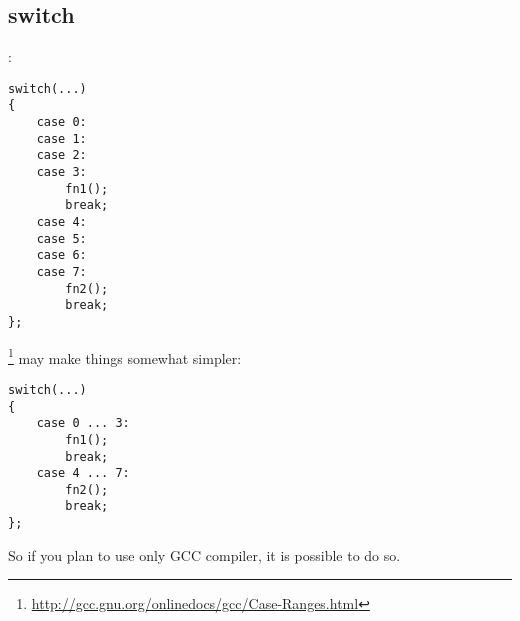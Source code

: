 ﻿\subsection{switch}

:

\begin{lstlisting}
switch(...)
{
	case 0:
	case 1:
	case 2:
	case 3:
		fn1();
		break;
	case 4:
	case 5:
	case 6:
	case 7:
		fn2();
		break;
};
\end{lstlisting}

\footnote{\url{http://gcc.gnu.org/onlinedocs/gcc/Case-Ranges.html}} 
{may make things somewhat simpler}:

\begin{lstlisting}
switch(...)
{
	case 0 ... 3:
		fn1();
		break;
	case 4 ... 7:
		fn2();
		break;
};
\end{lstlisting}

{So if you plan to use only \ac{GCC} compiler, it is possible to do so}.

